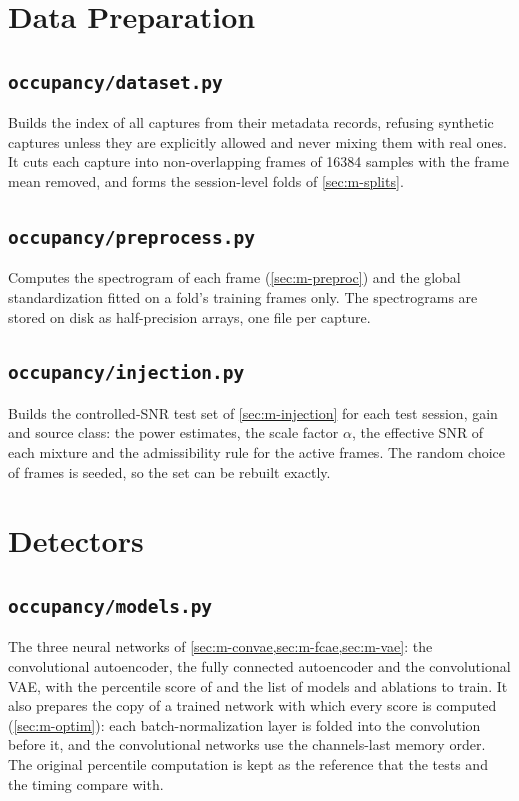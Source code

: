\begin{singlespace}

\section{Data Preparation}
\label{app:code-data}

\subsection*{\texttt{occupancy/dataset.py}}
Builds the index of all captures from their metadata records, refusing synthetic captures unless they are explicitly allowed and never mixing them with real ones. It cuts each capture into non-overlapping frames of \num{16384} samples with the frame mean removed, and forms the session-level folds of \cref{sec:m-splits}.


\subsection*{\texttt{occupancy/preprocess.py}}
Computes the spectrogram of each frame (\cref{sec:m-preproc}) and the global standardization fitted on a fold's training frames only. The spectrograms are stored on disk as half-precision arrays, one file per capture.


\subsection*{\texttt{occupancy/injection.py}}
Builds the controlled-SNR test set of \cref{sec:m-injection} for each test session, gain and source class: the power estimates, the scale factor $\alpha$, the effective SNR of each mixture and the admissibility rule for the active frames. The random choice of frames is seeded, so the set can be rebuilt exactly.


\section{Detectors}
\label{app:code-detectors}

\subsection*{\texttt{occupancy/models.py}}
The three neural networks of \cref{sec:m-convae,sec:m-fcae,sec:m-vae}: the convolutional autoencoder, the fully connected autoencoder and the convolutional VAE, with the percentile score of \textcite{tian2022} and the list of models and ablations to train. It also prepares the copy of a trained network with which every score is computed (\cref{sec:m-optim}): each batch-normalization layer is folded into the convolution before it, and the convolutional networks use the channels-last memory order. The original percentile computation is kept as the reference that the tests and the timing compare with.



\end{singlespace}
